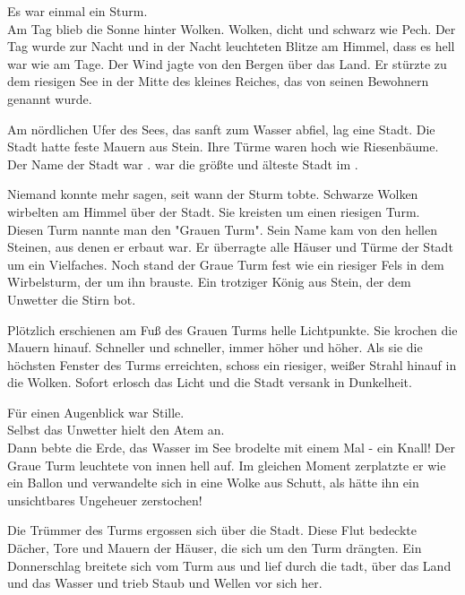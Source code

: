 





\begin{huge}
\begin{itshape}
Es war einmal ein Sturm.\\
Am Tag blieb die Sonne hinter Wolken. Wolken, dicht und schwarz wie Pech. Der Tag wurde zur Nacht und in der Nacht leuchteten Blitze am Himmel, dass es hell war wie am Tage. Der Wind jagte von den Bergen über das Land. Er stürzte zu dem riesigen See in der Mitte des kleines Reiches, das von seinen Bewohnern {\Enland} genannt wurde. 

Am nördlichen Ufer des Sees, das sanft zum Wasser abfiel, lag eine Stadt. Die Stadt hatte feste Mauern aus Stein. Ihre Türme waren hoch wie Riesenbäume. Der Name der Stadt war {\Tern}. {\Tern} war die größte und älteste Stadt im {\Enland}. 

Niemand konnte mehr sagen, seit wann der Sturm tobte. Schwarze Wolken wirbelten am Himmel über der Stadt. Sie kreisten um einen riesigen Turm. Diesen Turm nannte man den "Grauen Turm". Sein Name kam von den hellen Steinen, aus denen er erbaut war. Er überragte alle Häuser und Türme der Stadt um ein Vielfaches. Noch stand der Graue Turm fest wie ein riesiger Fels in dem Wirbelsturm, der um ihn brauste. Ein trotziger König aus Stein, der dem Unwetter die Stirn bot.

Plötzlich erschienen am Fuß des Grauen Turms helle Lichtpunkte. Sie krochen die Mauern hinauf. Schneller und schneller, immer höher und höher. Als sie die höchsten Fenster des Turms erreichten, schoss ein riesiger, weißer Strahl hinauf in die Wolken. Sofort erlosch das Licht und die Stadt versank in Dunkelheit.

Für einen Augenblick war Stille.\\
Selbst das Unwetter hielt den Atem an.\\
Dann bebte die Erde, das Wasser im See brodelte mit einem Mal - ein Knall! Der Graue Turm leuchtete von innen hell auf. Im gleichen Moment zerplatzte er wie ein Ballon und verwandelte sich in eine Wolke aus Schutt, als hätte ihn ein unsichtbares Ungeheuer zerstochen! 

Die Trümmer des Turms ergossen sich über die Stadt. Diese Flut bedeckte Dächer, Tore und Mauern der Häuser, die sich um den Turm drängten. Ein Donnerschlag breitete sich vom Turm aus und lief durch die tadt, über das Land und das Wasser und trieb Staub und Wellen vor sich her.


\end{itshape}
\end{huge}
